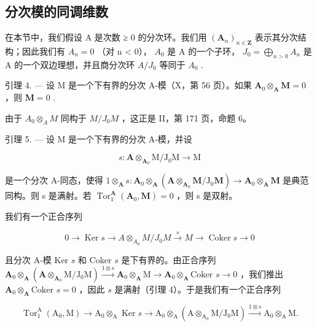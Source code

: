 \subsection{分次模的同调维数}

在本节中，我们假设 A 是次数 ≥ 0 的分次环。我们用 \((\mathbf{A}_{n})_{n \in \mathbf{Z}}\) 表示其分次结构；因此我们有 \(A_{n} = 0\) （对 n \textless{} 0）， \(A_{0}\) 是 A 的一个子环， \(J_{0} = \bigoplus_{n > 0} A_{n}\) 是 A 的一个双边理想，并且商分次环 \(A/J_{0}\) 等同于 \(A_{0}\) .

引理 4. --- 设 M 是一个下有界的分次 A-模（X，第 56 页）。如果 \(\mathbf{A}_0\otimes_{\mathbf{A}}\mathbf{M} = 0\) ，则 \(\mathbf{M} = 0\) .

由于 \(A_{0} \otimes_{A} M\) 同构于 \(M/J_{0} M\) ，这正是 II，第 171 页，命题 6。

引理 5. --- 设 M 是一个下有界的分次 A-模，并设

\[
s: \mathbf {A} \otimes_ {\mathbf {A} _ {0}} \mathrm{M} / \mathrm{J} _ {0} \mathrm{M} \rightarrow \mathrm{M}
\]

是一个分次 A-同态，使得 \(1 \otimes_{\mathbf{A}} s: \mathbf{A}_0 \otimes_{\mathbf{A}} (\mathbf{A} \otimes_{\mathbf{A}_0} \mathbf{M} / \mathrm{J}_0 \mathbf{M}) \to \mathbf{A}_0 \otimes_{\mathbf{A}} \mathbf{M}\) 是典范同构。则 s 是满射。若 \(\operatorname{Tor}_1^{\mathbf{A}}(\mathbf{A}_0, \mathbf{M}) = 0\) ，则 s 是双射。

我们有一个正合序列

\[
0 \rightarrow \operatorname{Ker} s \rightarrow A \otimes_ {A _ {0}} M / J _ {0} M \xrightarrow {s} M \rightarrow \operatorname{Coker} s \rightarrow 0
\]

且分次 A-模 Ker \(s\) 和 Coker \(s\) 是下有界的。由正合序列 \(\mathbf{A}_{0} \otimes_{\mathbf{A}} (\mathbf{A} \otimes_{\mathbf{A}_{0}} \mathrm{M} / \mathrm{J}_{0} \mathrm{M}) \xrightarrow{1 \otimes s} \mathbf{A}_{0} \otimes_{\mathbf{A}} \mathrm{M} \to \mathbf{A}_{0} \otimes_{\mathbf{A}} \text{Coker } s \to 0\) ，我们推出 \(\mathbf{A}_{0} \otimes_{\mathbf{A}} \text{Coker } s = 0\) ，因此 \(s\) 是满射（引理 4）。于是我们有一个正合序列

\[
\operatorname{Tor} _ {1} ^ {\mathrm{A}} \left(\mathrm{A} _ {0}, \mathrm{M}\right)\rightarrow \mathrm{A} _ {0} \otimes_ {\mathrm{A}} \operatorname{Ker} s \rightarrow \mathrm{A} _ {0} \otimes_ {\mathrm{A}} \left(\mathrm{A} \otimes_ {\mathrm{A} _ {0}} \mathrm{M} / \mathrm{J} _ {0} \mathrm{M}\right) \xrightarrow {1 \otimes s} \mathrm{A} _ {0} \otimes_ {\mathrm{A}} \mathrm{M}.
\]

